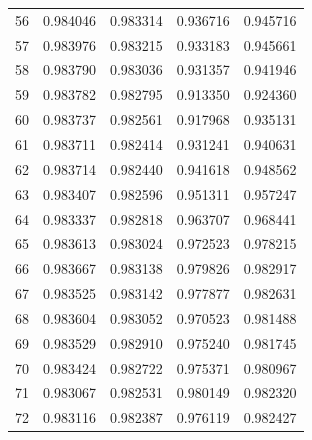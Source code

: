 \begin{table}
\begin{tabular}{rrrrr}
56 & 0.984046 & 0.983314 & 0.936716 & 0.945716 \\
57 & 0.983976 & 0.983215 & 0.933183 & 0.945661 \\
58 & 0.983790 & 0.983036 & 0.931357 & 0.941946 \\
59 & 0.983782 & 0.982795 & 0.913350 & 0.924360 \\
60 & 0.983737 & 0.982561 & 0.917968 & 0.935131 \\
61 & 0.983711 & 0.982414 & 0.931241 & 0.940631 \\
62 & 0.983714 & 0.982440 & 0.941618 & 0.948562 \\
63 & 0.983407 & 0.982596 & 0.951311 & 0.957247 \\
64 & 0.983337 & 0.982818 & 0.963707 & 0.968441 \\
65 & 0.983613 & 0.983024 & 0.972523 & 0.978215 \\
66 & 0.983667 & 0.983138 & 0.979826 & 0.982917 \\
67 & 0.983525 & 0.983142 & 0.977877 & 0.982631 \\
68 & 0.983604 & 0.983052 & 0.970523 & 0.981488 \\
69 & 0.983529 & 0.982910 & 0.975240 & 0.981745 \\
70 & 0.983424 & 0.982722 & 0.975371 & 0.980967 \\
71 & 0.983067 & 0.982531 & 0.980149 & 0.982320 \\
72 & 0.983116 & 0.982387 & 0.976119 & 0.982427 \\
\bottomrule
\end{tabular}
\end{table}
